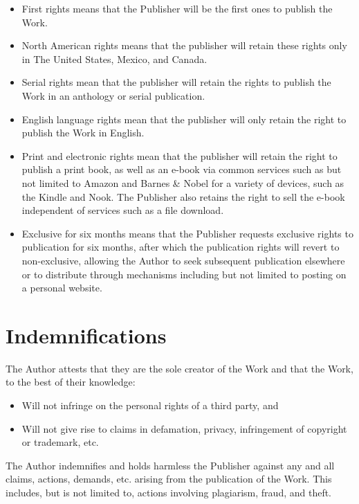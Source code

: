 \documentclass[12pt,letterpaper,oneside]{article}
\begin{document}
\begin{itemize}
    \item First rights means that the Publisher will be the first ones to publish the Work.
    \item North American rights means that the publisher will retain these rights only in The United States, Mexico, and Canada.
    \item Serial rights mean that the publisher will retain the rights to publish the Work in an anthology or serial publication.
    \item English language rights mean that the publisher will only retain the right to publish the Work in English.
    \item Print and electronic rights mean that the publisher will retain the right to publish a print book, as well as an e-book via common services such as but not limited to Amazon and Barnes \& Nobel for a variety of devices, such as the Kindle and Nook. The Publisher also retains the right to sell the e-book independent of services such as a file download.
    \item Exclusive for six months means that the Publisher requests exclusive rights to publication for six months, after which the publication rights will revert to non-exclusive, allowing the Author to seek subsequent publication elsewhere or to distribute through mechanisms including but not limited to posting on a personal website.
\end{itemize}

\section{Indemnifications}

The Author attests that they are the sole creator of the Work and that the Work, to the best of their knowledge:

\begin{itemize}
    \item Will not infringe on the personal rights of a third party, and
    \item Will not give rise to claims in defamation, privacy, infringement of copyright or trademark, etc.
\end{itemize}

The Author indemnifies and holds harmless the Publisher against any and all claims, actions, demands, etc. arising from the publication of the Work. This includes, but is not limited to, actions involving plagiarism, fraud, and theft.
\end{document}
